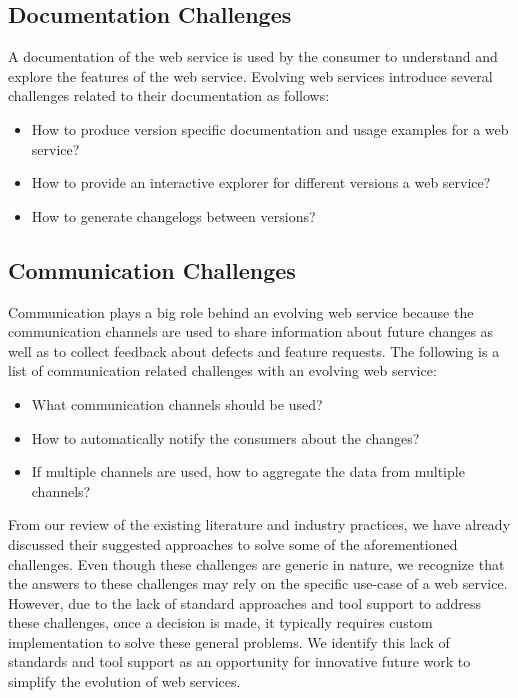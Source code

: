 \documentclass[runningheads,a4paper]{llncs}
\begin{document}
\subsection{Documentation Challenges} %
\label{ssub:documentation_challenges}
A documentation of the web service is used by the consumer to understand and explore the features of the web service. Evolving web services introduce several challenges related to their documentation as follows:
\begin{itemize}
  \item How to produce version specific documentation and usage examples for a web service?
  \item How to provide an interactive explorer for different versions a web service?
  \item How to generate changelogs between versions?
\end{itemize}

\subsection{Communication Challenges} %
\label{sub:communication_challenges}
Communication plays a big role behind an evolving web service because the communication channels are used to share information about future changes as well as to collect feedback about defects and feature requests. The following is a list of communication related challenges with an evolving web service:
\begin{itemize}
  \item What communication channels should be used?
  \item How to automatically notify the consumers about the changes?
  \item If multiple channels are used, how to aggregate the data from multiple channels?
\end{itemize}


From our review of the existing literature and industry practices, we have already discussed their suggested approaches to solve some of the aforementioned challenges. Even though these challenges are generic in nature, we recognize that the answers to these challenges may rely on the specific use-case of a web service. However, due to the lack of standard approaches and tool support to address these challenges, once a decision is made, it typically requires custom implementation to solve these general problems. We identify this lack of standards and tool support as an opportunity for innovative future work to simplify the evolution of web services.
\end{document}
